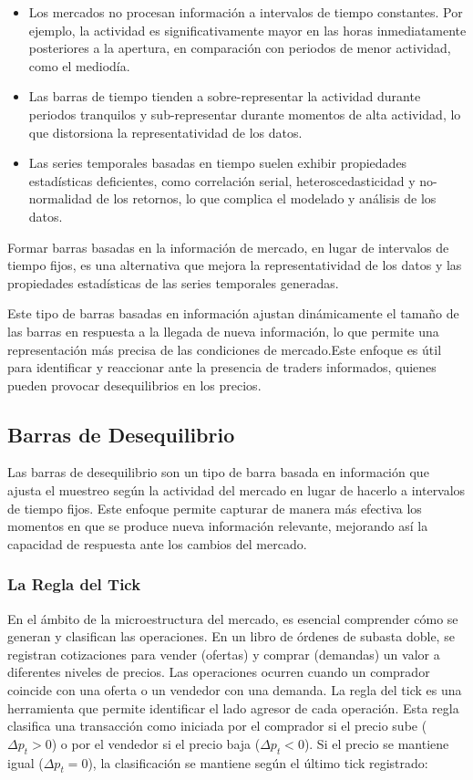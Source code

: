 \documentclass[a4paper,12pt, twoside]{report}
\begin{document}
\begin{itemize}
    \item Los mercados no procesan información a intervalos de tiempo constantes. Por ejemplo, la 
    actividad es significativamente mayor en las horas inmediatamente posteriores a la apertura, 
    en comparación con periodos de menor actividad, como el mediodía.
    \item Las barras de tiempo tienden a sobre-representar la actividad durante periodos tranquilos 
    y sub-representar durante momentos de alta actividad, lo que distorsiona la representatividad de los datos.
    \item Las series temporales basadas en tiempo suelen exhibir propiedades estadísticas deficientes, 
    como correlación serial, heteroscedasticidad y no-normalidad de los retornos, lo que complica el 
    modelado y análisis de los datos.
\end{itemize}

Formar barras basadas en la información de mercado, en lugar de intervalos de tiempo fijos, 
es una alternativa que mejora la representatividad de los datos y las propiedades estadísticas 
de las series temporales generadas. 

Este tipo de barras basadas en información ajustan dinámicamente el tamaño de las barras
en respuesta a la llegada de nueva información, lo que permite una representación
más precisa de las condiciones de mercado.Este enfoque es útil para identificar y reaccionar 
ante la presencia de traders
informados, quienes pueden provocar desequilibrios en los precios.

\subsection{Barras de Desequilibrio}

Las barras de desequilibrio son un tipo de barra basada en información que ajusta el muestreo 
según la actividad del mercado en lugar de hacerlo a intervalos de tiempo fijos. Este enfoque 
permite capturar de manera más efectiva los momentos en que se produce nueva información relevante, 
mejorando así la capacidad de respuesta ante los cambios del mercado.

\subsubsection{La Regla del Tick}

En el ámbito de la microestructura del mercado, es esencial comprender cómo se generan y clasifican las operaciones. En un 
libro de órdenes de subasta doble, se registran cotizaciones para vender (ofertas) y comprar (demandas) un valor a diferentes 
niveles de precios. Las operaciones ocurren cuando un comprador coincide con una oferta o un vendedor con una demanda. La regla 
del tick es una herramienta que permite identificar el lado agresor de cada operación. Esta regla clasifica una transacción 
como iniciada por el comprador si el precio sube (\(\Delta p_t > 0\)) o por el vendedor si el precio baja (\(\Delta p_t < 0\)). 
Si el precio se mantiene igual (\(\Delta p_t = 0\)), la clasificación se mantiene según el último tick registrado:
\end{document}
